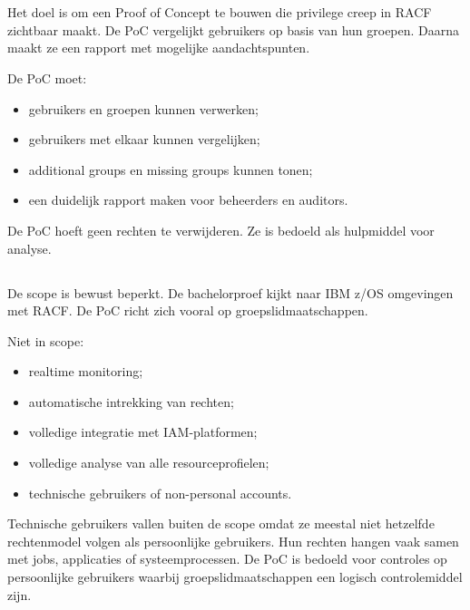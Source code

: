 \section{}%
\label{sec:onderzoeksdoelstelling}

Het doel is om een Proof of Concept te bouwen die privilege creep in RACF zichtbaar maakt. De PoC vergelijkt gebruikers op basis van hun groepen. Daarna maakt ze een rapport met mogelijke aandachtspunten.

De PoC moet:

\begin{itemize}
	\item gebruikers en groepen kunnen verwerken;
	\item gebruikers met elkaar kunnen vergelijken;
	\item additional groups en missing groups kunnen tonen;
	\item een duidelijk rapport maken voor beheerders en auditors.
\end{itemize}

De PoC hoeft geen rechten te verwijderen. Ze is bedoeld als hulpmiddel voor analyse.

\subsection*{}%
\label{sec:scope}

De scope is bewust beperkt. De bachelorproef kijkt naar IBM z/OS omgevingen met RACF. De PoC richt zich vooral op groepslidmaatschappen.

Niet in scope:

\begin{itemize}
	\item realtime monitoring;
	\item automatische intrekking van rechten;
	\item volledige integratie met IAM-platformen;
	\item volledige analyse van alle resourceprofielen;
	\item technische gebruikers of non-personal accounts.
\end{itemize}

Technische gebruikers vallen buiten de scope omdat ze meestal niet hetzelfde rechtenmodel volgen als persoonlijke gebruikers. Hun rechten hangen vaak samen met jobs, applicaties of systeemprocessen. De PoC is bedoeld voor controles op persoonlijke gebruikers waarbij groepslidmaatschappen een logisch controlemiddel zijn.

